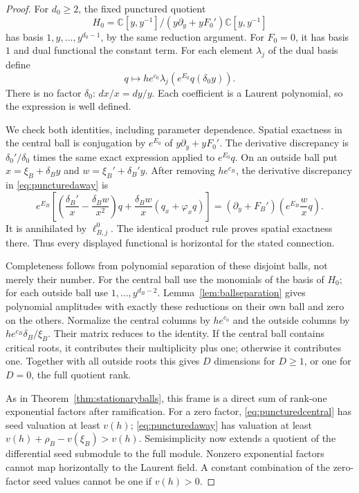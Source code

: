 \documentclass[11pt]{article}
\theoremstyle{definition}\newtheorem{definition}[theorem]{Definition}
\theoremstyle{remark}\newtheorem{remark}[theorem]{Remark}
\newcommand{\C}{\mathbb C}
\begin{document}
\begin{proof}
For $d_0\geq2$, the fixed punctured quotient
\[
 H_0=\C[y,y^{-1}]/(y\partial_y+yF_0')\C[y,y^{-1}]
\]
has basis $1,y,\ldots,y^{d_0-1}$, by the same reduction argument.
For $F_0=0$, it has basis $1$ and dual functional the constant term.
For each element $\lambda_j$ of the dual basis define
\begin{equation}\label{eq:puncturedcentral}
 q\longmapsto h e^{c_0}\lambda_j
                   \!\left(e^{E_0}q(\delta_0 y)\right).
\end{equation}
There is no factor $\delta_0$: $dx/x=dy/y$. Each coefficient is
a Laurent polynomial, so the expression is well defined.

We check both identities, including parameter dependence. Spatial
exactness in the central ball is conjugation by $e^{E_0}$ of
$y\partial_y+yF_0'$. The derivative discrepancy is
$\delta_0'/\delta_0$ times the same exact expression applied to
$e^{E_0}q$. On an outside ball put $x=\xi_B+\delta_B y$ and
$w=\xi_B'+\delta_B'y$. After removing $h e^{c_B}$, the derivative
discrepancy in \eqref{eq:puncturedaway} is
\[
 e^{E_B}\left[
   \left(\frac{\delta_B'}x-\frac{\delta_B w}{x^2}\right)q
        +\frac{\delta_B w}x(q_x+\varphi_xq)\right]
 = (\partial_y+F_B')\left(e^{E_B}\frac wxq\right).
\]
It is annihilated by $\ell^0_{B,j}$. The identical product rule
proves spatial exactness there. Thus every displayed functional is
horizontal for the stated connection.

Completeness follows from polynomial separation of these disjoint
balls, not merely their number. For the central ball use the monomials
of the basis of $H_0$; for each outside ball use
$1,\ldots,y^{d_B-2}$. Lemma~\ref{lem:ballseparation} gives polynomial
amplitudes with exactly these reductions on their own ball and zero
on the others. Normalize the central columns by $h e^{c_0}$ and
the outside columns by $h e^{c_B}\delta_B/\xi_B$. Their matrix
reduces to the identity. If the central ball contains critical roots,
it contributes their multiplicity plus one; otherwise it contributes
one. Together with all outside roots this gives $D$ dimensions for
$D\geq1$, or one for $D=0$, the full quotient rank.

As in Theorem~\ref{thm:stationaryballs}, this frame is a direct sum
of rank-one exponential factors after ramification. For a zero factor,
\eqref{eq:puncturedcentral} has seed valuation at least $v(h)$;
\eqref{eq:puncturedaway} has valuation at least
$v(h)+\rho_B-v(\xi_B)>v(h)$. Semisimplicity now extends a quotient
of the differential seed submodule to the full module. Nonzero
exponential factors cannot map horizontally to the Laurent field.
A constant combination of the zero-factor seed values cannot be
one if $v(h)>0$.
\end{proof}
\end{document}
